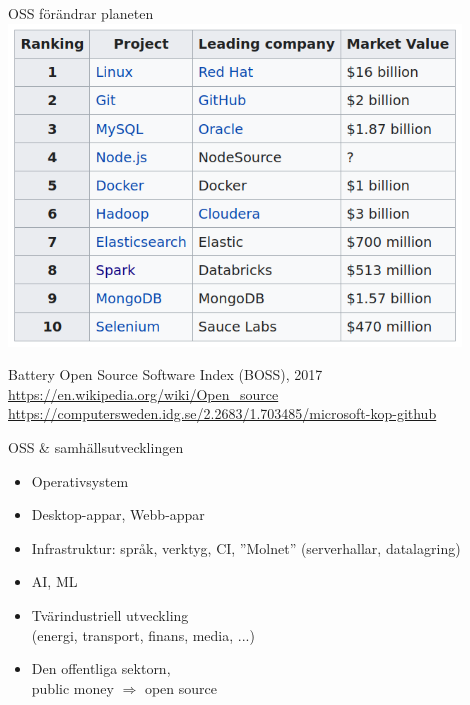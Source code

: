 \documentclass{simpleslides}
\begin{document}
\begin{Slide}{OSS förändrar planeten}
\hspace*{-0.2cm}\includegraphics[width=0.9\textwidth]{img/oss}

{\noindent\tiny Battery Open Source Software Index (BOSS), 2017 \\\href{https://en.wikipedia.org/wiki/Open_source}{https://en.wikipedia.org/wiki/Open\_source}\\\href{https://computersweden.idg.se/2.2683/1.703485/microsoft-kop-github}{https://computersweden.idg.se/2.2683/1.703485/microsoft-kop-github}} 

\end{Slide}

\begin{Slide}{OSS \& samhällsutvecklingen}
\begin{itemize}
\item Operativsystem
\item Desktop-appar, Webb-appar
\item Infrastruktur: språk, verktyg, CI, ''Molnet'' (serverhallar, datalagring)
\item AI, ML
\item Tvärindustriell utveckling\\(energi, transport, finans, media, ...)
\item Den offentliga sektorn, \\ public money $\Rightarrow$ open source
\end{itemize}
\end{Slide}
\end{document}
